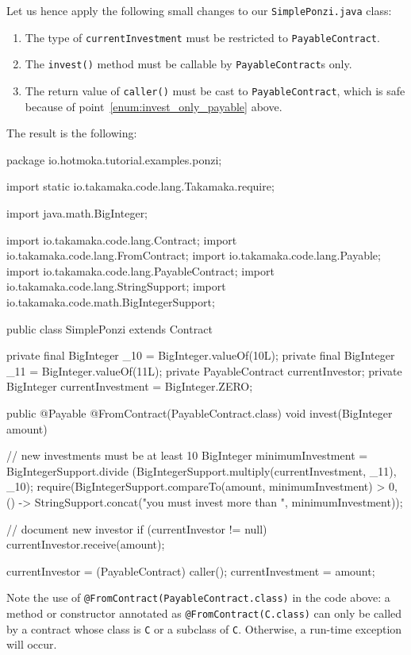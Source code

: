 Let us hence apply the following small changes to our \texttt{SimplePonzi.java} class:
%
\begin{enumerate}
\item The type of \texttt{currentInvestment} must be restricted to \texttt{PayableContract}.
\item The \texttt{invest()} method must be callable by \texttt{PayableContract}s only.\label{enum:invest_only_payable}
\item The return value of \texttt{caller()} must be cast to \texttt{PayableContract}, which is
  safe because of point~\ref{enum:invest_only_payable} above.
\end{enumerate}
%
The result is the following:
%
\begin{codebox}\begin{javalst}
package io.hotmoka.tutorial.examples.ponzi;

import static io.takamaka.code.lang.Takamaka.require;

import java.math.BigInteger;

import io.takamaka.code.lang.Contract;
import io.takamaka.code.lang.FromContract;
import io.takamaka.code.lang.Payable;
import io.takamaka.code.lang.PayableContract;
import io.takamaka.code.lang.StringSupport;
import io.takamaka.code.math.BigIntegerSupport;

public class SimplePonzi extends Contract {
  private final BigInteger _10 = BigInteger.valueOf(10L);
  private final BigInteger _11 = BigInteger.valueOf(11L);
  private PayableContract currentInvestor;
  private BigInteger currentInvestment = BigInteger.ZERO;

  public @Payable @FromContract(PayableContract.class) void invest(BigInteger amount) {
    // new investments must be at least 10%
    BigInteger minimumInvestment = BigIntegerSupport.divide
      (BigIntegerSupport.multiply(currentInvestment, _11), _10);
    require(BigIntegerSupport.compareTo(amount, minimumInvestment) > 0,
      () -> StringSupport.concat("you must invest more than ", minimumInvestment));

    // document new investor
    if (currentInvestor != null)
    	currentInvestor.receive(amount);

    currentInvestor = (PayableContract) caller();
    currentInvestment = amount;
  }
}
\end{javalst}\end{codebox}
%
Note the use of \texttt{@FromContract(PayableContract.class)} in the code above:
a method or constructor
annotated as \texttt{@FromContract(C.class)} can only be called by a contract whose class
is \texttt{C} or a subclass of \texttt{C}. Otherwise, a run-time exception will occur.

